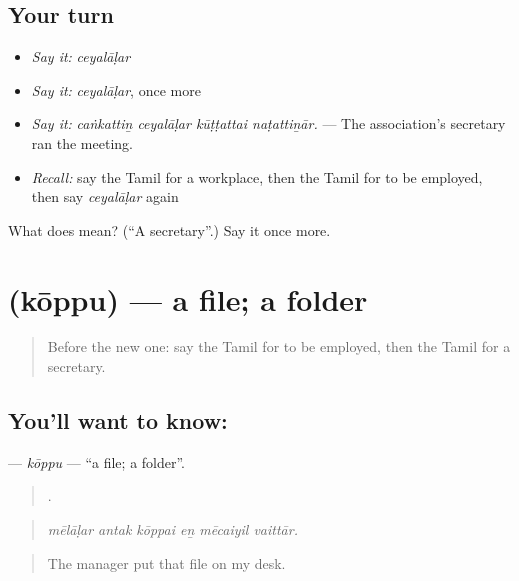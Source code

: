 \subsection*{Your turn}
\begin{itemize}
\raggedright
  \item \emph{Say it:} \emph{ceyalāḷar}
  \item \emph{Say it:} \emph{ceyalāḷar}, once more
  \item \emph{Say it:} \emph{caṅkattiṉ ceyalāḷar kūṭṭattai naṭattiṉār.} — The association's secretary ran the meeting.
  \item \emph{Recall:} say the Tamil for a workplace, then the Tamil for to be employed, then say \emph{ceyalāḷar} again
\end{itemize}

\begin{tcolorbox}[breakable,colback=teal!4,colframe=teal!35!black,title={Before you move on}]
What does  mean? (\textquotedblleft{}A secretary\textquotedblright{}.) Say it once more.
\end{tcolorbox}
\section[\texorpdfstring{\ta{கோப்பு} (kōppu)}{கோப்பு (kōppu)}]{ (kōppu) — a file; a folder}

\label{lesson:TA-C507-koppu}



\begin{quote}
Before the new one: say the Tamil for to be employed, then the Tamil for a secretary.
\end{quote}

\subsection*{You'll want to know: }
\textbf{} — \emph{kōppu} — \textquotedblleft{}a file; a folder\textquotedblright{}.

\begin{quote}
     .
\end{quote}

\begin{quote}
\emph{mēlāḷar antak kōppai eṉ mēcaiyil vaittār.}
\end{quote}

\begin{quote}
The manager put that file on my desk.
\end{quote}

